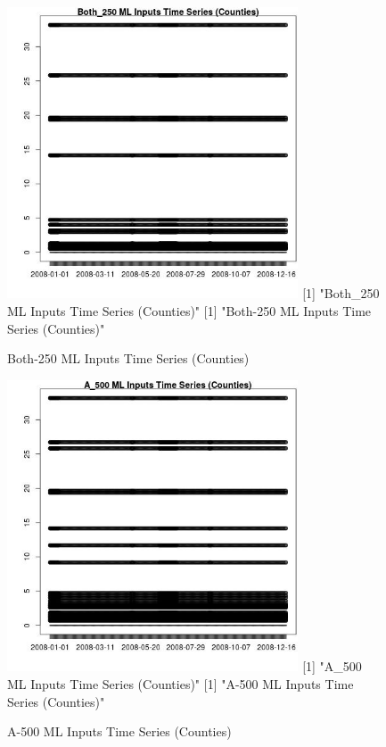 \begin{figure} 
\centering  
\includegraphics[width=0.77\textwidth]{Code_Outputs/ML_input_report_ML_input_CountyGeometricCentroids_Locations_Dates_part_c_2008-01-01to2008-12-31_Both_250TS.jpg} 
[1] "Both_250 ML Inputs Time Series (Counties)"
[1] "Both-250 ML Inputs Time Series (Counties)"
\caption{\label{fig:ML_input_report_ML_input_CountyGeometricCentroids_Locations_Dates_part_c_2008-01-01to2008-12-31Both_250TS}Both-250 ML Inputs Time Series (Counties)} 
\end{figure} 
 

\begin{figure} 
\centering  
\includegraphics[width=0.77\textwidth]{Code_Outputs/ML_input_report_ML_input_CountyGeometricCentroids_Locations_Dates_part_c_2008-01-01to2008-12-31_A_500TS.jpg} 
[1] "A_500 ML Inputs Time Series (Counties)"
[1] "A-500 ML Inputs Time Series (Counties)"
\caption{\label{fig:ML_input_report_ML_input_CountyGeometricCentroids_Locations_Dates_part_c_2008-01-01to2008-12-31A_500TS}A-500 ML Inputs Time Series (Counties)} 
\end{figure} 
 

